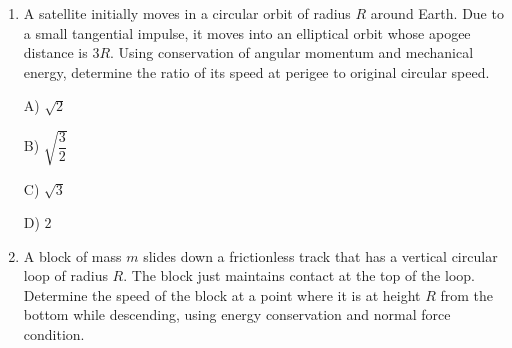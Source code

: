 \documentclass[12pt]{article}
\begin{document}
\begin{enumerate}
B) \(\dfrac{2}{3}g\sin30^\circ\)  

C) \(\dfrac{7}{5}g\sin30^\circ\)  

D) \(g\sin30^\circ\)

\item A satellite initially moves in a circular orbit of radius \(R\) around Earth. Due to a small tangential impulse, it moves into an elliptical orbit whose apogee distance is \(3R\). Using conservation of angular momentum and mechanical energy, determine the ratio of its speed at perigee to original circular speed.

A) \(\sqrt{2}\)  

B) \(\sqrt{\dfrac{3}{2}}\)  

C) \(\sqrt{3}\)  

D) \(2\)

\item A block of mass \(m\) slides down a frictionless track that has a vertical circular loop of radius \(R\). The block just maintains contact at the top of the loop. Determine the speed of the block at a point where it is at height \(R\) from the bottom while descending, using energy conservation and normal force condition.

\begin{center}
\end{center}
\end{enumerate}
\end{document}

